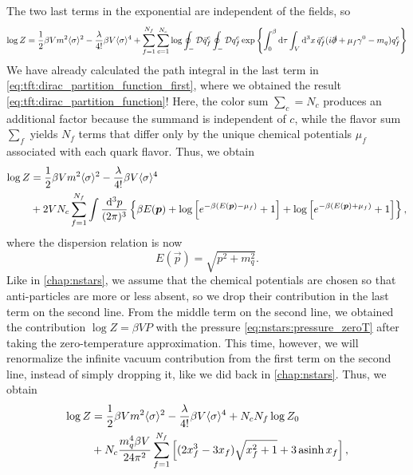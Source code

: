 The two last terms in the exponential are independent of the fields, so
\begin{equation}
	\log Z = \frac12 \beta V m^2 \langle \sigma \rangle^2 - \frac{\lambda}{4!} \beta V \langle \sigma \rangle^4 + \sum_{f=1}^{N_f} \sum_{c=1}^{N_c} \log \oint_- \mathcal{D} \bar{q}_f^c \oint_- \mathcal{D} q_f^c \exp \left\{ \int_0^\beta \mathop{}\!\mathrm{d} \tau \int_V \mathop{}\!\mathrm{d}^3 x \, \bar{q}_f^c (i \slashed\partial + \mu_f \gamma^0 - m_q) q_f^c \right\}
\end{equation}
We have already calculated the path integral in the last term in \cref{eq:tft:dirac_partition_function_first}, where we obtained the result \eqref{eq:tft:dirac_partition_function}!
Here, the color sum $\sum_c = N_c$ produces an additional factor because the summand is independent of $c$,
while the flavor sum $\sum_f$ yields $N_f$ terms that differ only by the unique chemical potentials $\mu_f$ associated with each quark flavor. 
Thus, we obtain
\begin{equation}
\begin{split}
	\log Z &= \frac12 \beta V m^2 \langle \sigma \rangle^2 - \frac{\lambda}{4!} \beta V \langle \sigma \rangle^4 \\
	       &+ 2 V N_c \sum_{f=1}^{N_f} \int \frac{\mathop{}\!\mathrm{d}^3 p}{(2 \pi)^3} \left\{ \beta E({\bm{p}}) + \log \left[ e^{-\beta (E({\bm{p}}) - \mu_f)}+1 \right] + \log \left[ e^{-\beta (E({\bm{p}}) + \mu_f)} + 1\right] \right\} ,
\end{split}
\label{eq:lsm:potential_divergent_logz0}
\end{equation}
where the dispersion relation is now
\begin{equation}
	E(\vec{p}) = \sqrt{p^2 + m_q^2} .
\end{equation}
Like in \cref{chap:nstars}, we assume that the chemical potentials are chosen so that anti-particles are more or less absent, so we drop their contribution in the last term on the second line.
From the middle term on the second line, we obtained the contribution $\log Z = \beta V P$ with the pressure \eqref{eq:nstars:pressure_zeroT} after taking the zero-temperature approximation.
This time, however, we will renormalize the infinite vacuum contribution from the first term on the second line, instead of simply dropping it, like we did back in \cref{chap:nstars}.
Thus, we obtain
\begin{equation}
\begin{split}
	\log Z &= \frac12 \beta V m^2 \langle \sigma \rangle^2 - \frac{\lambda}{4!} \beta V \langle \sigma \rangle^4 + N_c N_f \log Z_0 \\
	       &+ N_c \frac{m_q^4 \beta V}{24 \pi^2} \sum_{f=1}^{N_f} \left[ (2 x_f^3 - 3x_f) \sqrt{x_f^2 + 1} + 3 \operatorname{asinh} x_f \right],
\end{split}
\end{equation}
